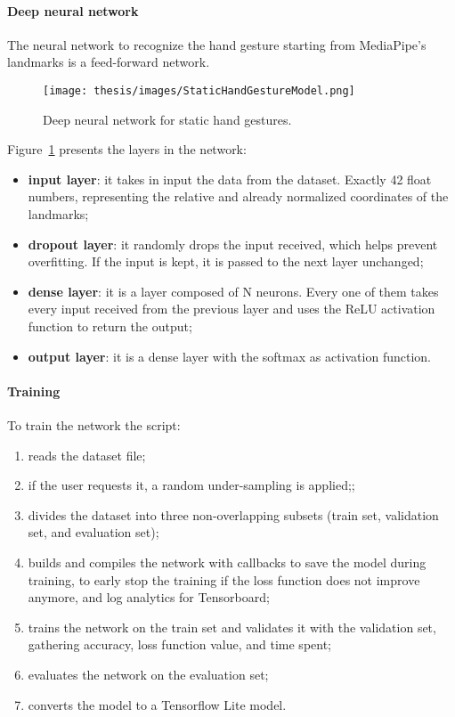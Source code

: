 \documentclass[../thesis.tex]{subfiles}
\begin{document}
\paragraph{Deep neural network}\label{p:static_hand_gesture_deep_neural_network}
The neural network to recognize the hand gesture starting from MediaPipe's landmarks is a feed-forward network.
\begin{figure}[H]
    \centering
    \texttt{[image: thesis/images/StaticHandGestureModel.png]}
    \caption{Deep neural network for static hand gestures.}
    \label{fig:static_hand_gesture_model}
\end{figure}
Figure~\ref{fig:static_hand_gesture_model} presents the layers in the network:
\begin{itemize}
    \item \textbf{input layer}: it takes in input the data from the dataset. Exactly 42 float numbers, representing the relative and already normalized coordinates of the landmarks; 
    \item \textbf{dropout layer}: it randomly drops the input received, which helps prevent overfitting. If the input is kept, it is passed to the next layer unchanged; 
    \item \textbf{dense layer}: it is a layer composed of N neurons. Every one of them takes every input received from the previous layer and uses the ReLU activation function to return the output;
    \item \textbf{output layer}: it is a dense layer with the softmax as activation function.
\end{itemize}

\paragraph{Training}\label{p:static_hand_gesture_training}
To train the network the script:
\begin{enumerate}
    \item reads the dataset file;
    \item if the user requests it, a random under-sampling is applied;;
    \item divides the dataset into three non-overlapping subsets (train set, validation set, and evaluation set);
    \item builds and compiles the network with callbacks to save the model during training, to early stop the training if the loss function does not improve anymore, and log analytics for Tensorboard; 
    \item trains the network on the train set and validates it with the validation set, gathering accuracy, loss function value, and time spent;
    \item evaluates the network on the evaluation set;
    \item converts the model to a Tensorflow Lite model.
\end{enumerate}
\end{document}
